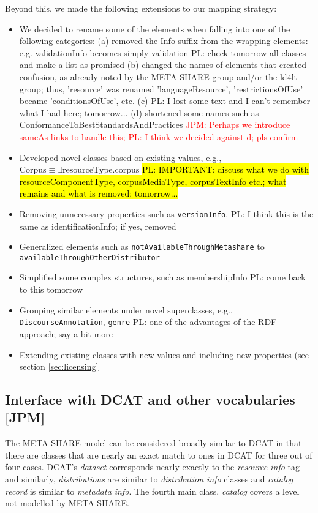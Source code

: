 \documentclass{llncs}
\begin{document}
Beyond this, we made the following extensions to our mapping strategy:
\begin{itemize}
\item We decided to rename some of the elements when falling into one of the following categories:
(a) removed the Info suffix from the wrapping elements: e.g. validationInfo becomes simply validation {PL: check tomorrow all classes and make a list as promised}
(b) changed the names of elements that created confusion, as already noted by the META-SHARE group and/or the ld4lt group; thus, 'resource' was renamed 'languageResource', 'restrictionsOfUse' became 'conditionsOfUse', etc.
(c) {PL: I lost some text and I can't remember what I had here; tomorrow...}
(d) shortened some names such as ConformanceToBestStandardsAndPractices
\textcolor{red}{JPM: Perhaps we introduce sameAs links to handle this; PL: I think we decided against d; pls confirm}
\item Developed novel classes based on existing values, e.g.,
$\mathrm{Corpus} \equiv \exists \mathrm{resourceType}.\mathrm{corpus}$
\hl {PL: IMPORTANT: discuss what we do with resourceComponentType, corpusMediaType, corpusTextInfo etc.; what remains and what is removed; tomorrow...}
\item Removing unnecessary properties such as {\tt versionInfo}.
{PL: I think this is the same as identificationInfo; if yes, removed}
\item Generalized elements such as {\tt notAvailableThroughMetashare} to {\tt availableThroughOtherDistributor}
\item Simplified some complex structures, such as membershipInfo  
{PL: come back to this tomorrow}
\item Grouping similar elements under novel superclasses, e.g., {\tt DiscourseAnnotation}, {\tt genre}
{PL: one of the advantages of the RDF approach; say a bit more}
\item Extending existing classes with new values and including new properties (see section \ref{sec:licensing}
\end{itemize}

\subsection{Interface with DCAT and other vocabularies [JPM]}
\label{sec:dcat}
The META-SHARE model can be considered broadly similar to DCAT in that there are
classes that are nearly an exact match to ones in DCAT for three out of four
cases. DCAT's \emph{dataset} corresponds nearly exactly to the \emph{resource
info} tag and similarly, \emph{distributions} are similar to \emph{distribution
info} classes and \emph{catalog record} is similar to \emph{metadata info}. The
fourth main class, \emph{catalog} covers a level not modelled by META-SHARE.
\end{document}
